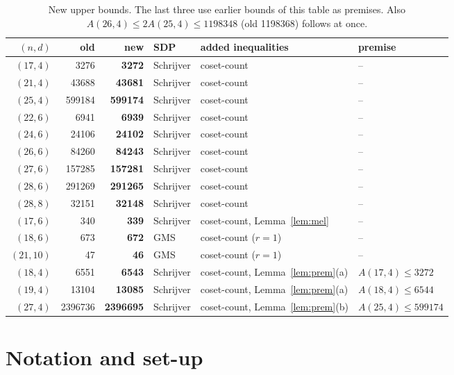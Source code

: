 \documentclass[11pt]{article}
\theoremstyle{remark}
\begin{document}
\begin{table}[ht]
\centering
\begin{tabular}{rrrlll}
\toprule
$(n,d)$ & old & new & SDP & added inequalities & premise \\
\midrule
$(17,4)$ & 3276 & \textbf{3272} & Schrijver & coset-count & -- \\
$(21,4)$ & 43688 & \textbf{43681} & Schrijver & coset-count & -- \\
$(25,4)$ & 599184 & \textbf{599174} & Schrijver & coset-count & -- \\
$(22,6)$ & 6941 & \textbf{6939} & Schrijver & coset-count & -- \\
$(24,6)$ & 24106 & \textbf{24102} & Schrijver & coset-count & -- \\
$(26,6)$ & 84260 & \textbf{84243} & Schrijver & coset-count & -- \\
$(27,6)$ & 157285 & \textbf{157281} & Schrijver & coset-count & -- \\
$(28,6)$ & 291269 & \textbf{291265} & Schrijver & coset-count & -- \\
$(28,8)$ & 32151 & \textbf{32148} & Schrijver & coset-count & -- \\
$(17,6)$ & 340 & \textbf{339} & Schrijver & coset-count, Lemma~\ref{lem:mel} & -- \\
$(18,6)$ & 673 & \textbf{672} & GMS & coset-count ($r=1$) & -- \\
$(21,10)$ & 47 & \textbf{46} & GMS & coset-count ($r=1$) & -- \\
\midrule
$(18,4)$ & 6551 & \textbf{6543} & Schrijver & coset-count, Lemma~\ref{lem:prem}(a) & $A(17,4)\le 3272$ \\
$(19,4)$ & 13104 & \textbf{13085} & Schrijver & coset-count, Lemma~\ref{lem:prem}(a) & $A(18,4)\le 6544$ \\
$(27,4)$ & 2396736 & \textbf{2396695} & Schrijver & coset-count, Lemma~\ref{lem:prem}(b) & $A(25,4)\le 599174$ \\
\bottomrule
\end{tabular}
\caption{New upper bounds. The last three use earlier bounds of this table as premises.
Also $A(26,4)\le 2A(25,4)\le 1198348$ (old 1198368) follows at once.}
\label{tab:results}
\end{table}

\section{Notation and set-up}\label{sec:setup}
\end{document}
